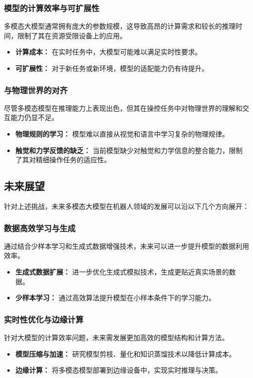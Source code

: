 \documentclass[a4paper]{article}
\begin{document}
\subsubsection{模型的计算效率与可扩展性}
多模态大模型通常拥有庞大的参数规模，这导致高昂的计算需求和较长的推理时间，限制了其在资源受限设备上的应用\cite{huang2023embodied, wang2023robogen}。
\begin{itemize}
    \item \textbf{计算成本：} 在实时任务中，大模型可能难以满足实时性要求。
    \item \textbf{可扩展性：} 对于新任务或新环境，模型的适配能力仍有待提升。
\end{itemize}

\subsubsection{与物理世界的对齐}
尽管多模态模型在推理能力上表现出色，但其在操控任务中对物理世界的理解和交互能力仍显不足\cite{wei2024wearable, huang2024manipvqa}。
\begin{itemize}
    \item \textbf{物理规则的学习：} 模型难以直接从视觉和语言中学习复杂的物理规律。
    \item \textbf{触觉和力学反馈的缺乏：} 当前模型缺少对触觉和力学信息的整合能力，限制了其对精细操作任务的适应性。
\end{itemize}

\subsection{未来展望}
针对上述挑战，未来多模态大模型在机器人领域的发展可以沿以下几个方向展开：
\subsubsection{数据高效学习与生成}
通过结合少样本学习和生成式数据增强技术，未来可以进一步提升模型的数据利用效率\cite{wang2023mimicplay, mandlekar2023mimicgen}。
\begin{itemize}
    \item \textbf{生成式数据扩展：} 进一步优化生成式模拟技术，生成更贴近真实场景的数据。
    \item \textbf{少样本学习：} 通过高效算法提升模型在小样本条件下的学习能力。
\end{itemize}

\subsubsection{实时性优化与边缘计算}
针对大模型的计算效率问题，未来需发展更加高效的模型结构和计算方法\cite{huang2023embodied, hu2023look}。
\begin{itemize}
    \item \textbf{模型压缩与加速：} 研究模型剪枝、量化和知识蒸馏技术以降低计算成本。
    \item \textbf{边缘计算：} 将多模态模型部署到边缘设备中，实现实时推理与决策。
\end{itemize}
\end{document}
